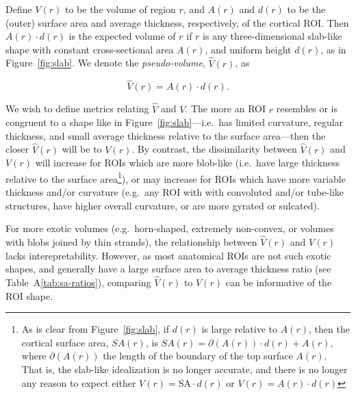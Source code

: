 \documentclass{article}
\newcommand{\note}[2][cyan]{\textbf{NOTE}: \textcolor{#1}{#2}}
\begin{document}


Define \(V(r)\) to be the volume of region \(r\), and \(A(r)\) and \(d(r)\)
to be the (outer) surface area and average thickness, respectively, of the
cortical ROI\@. Then \(A(r) \cdot d(r)\) is the
expected volume of \(r\) if \(r\) is any three-dimensional slab-like shape
with constant cross-sectional area \(A(r)\), and uniform height \(d(r)\), as
in Figure~\ref{fig:slab}. We denote the \emph{pseudo-volume},
\(\hat{V}(r)\), as

\begin{equation}
\hat{V}(r) = A(r) \cdot d(r).
\end{equation}

We wish to define metrics relating \(\hat{V}\) and \(V\). The more an ROI
\(r\) resembles or is congruent to a shape like in
Figure~\ref{fig:slab}---i.e.\ has limited curvature, regular thickness, and
small average thickness relative to the surface area---then the closer
\(\hat{V}(r)\) will be to \(V(r)\). By contrast, the dissimilarity between
\(\hat{V}(r)\) and \(V(r)\) will increase for ROIs which are more blob-like
(i.e.\ have large thickness relative to the surface area\footnote{As is clear
from Figure~\ref{fig:slab}, if \(d(r)\) is large relative to \(A(r)\), then
the cortical surface area, \(SA(r)\), is \(SA(r) = \partial(A(r)) \cdot d(r)
+ A(r)\), where \(\partial(A(r))\) the length of the boundary of the top
surface \(A(r)\). That is, the slab-like idealization is no longer accurate,
and there is no longer any reason to expect either \(V(r) = \text{SA} \cdot
d(r)\) or \(V(r) = A(r) \cdot d(r)\)}), or may increase for ROIs which have
more variable thickness and/or curvature (e.g.\ any ROI with with convoluted
and/or tube-like structures, have higher overall curvature, or are more
gyrated or sulcated).

For more exotic volumes (e.g.\ horn-shaped, extremely non-convex, or volumes
with blobs joined by thin strands), the relationship between \(\hat{V}(r)\)
and \(V(r)\) lacks interepretability. However, as most anatomical ROIs are
not such exotic shapes, and generally have a large surface area to average
thickness ratio (see Table~A\ref{tab:sa-ratios}), comparing \(\hat{V}(r)\) to
\(V(r)\) can be informative of the ROI shape.
\end{document}
